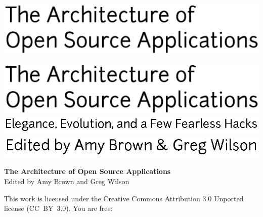 \newpage

\thispagestyle{empty}
\hspace{-2cm}\includegraphics[width=400pt]{../images/frontmatter/title.eps} 

\newpage

\thispagestyle{empty}
\mbox{}    %

\newpage

\thispagestyle{empty}
\hspace{-2cm}\includegraphics[width=400pt]{../images/frontmatter/title.eps} 
\\
\vspace{0.5cm}
\hspace{2.8cm}\includegraphics{../images/frontmatter/subtitle.eps}
\\[13.5cm]
\vspace{0.5cm}
\hspace{6.5cm}\includegraphics{../images/frontmatter/eds.eps}

\newpage

\thispagestyle{empty}

\small
\noindent \textbf{The Architecture of Open Source Applications} \\
Edited by Amy Brown and Greg Wilson

\vspace{0.15cm}

\noindent
This work is licensed under the Creative Commons Attribution 3.0
Unported license (CC~BY~3.0).  You are free:

